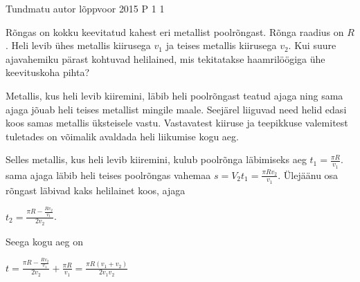 {Tundmatu autor} %
{lõppvoor} %
{2015} %
{P 1} %
{1} %
{

\ifStatement
Rõngas on kokku keevitatud kahest eri metallist poolrõngast. Rõnga raadius on $R$. Heli levib ühes metallis kiirusega $v_1$ ja teises metallis kiirusega $v_2$. Kui suure ajavahemiku pärast kohtuvad helilained, mis tekitatakse haamrilöögiga ühe keevituskoha pihta?
\fi

\ifHint
Metallis, kus heli levib kiiremini, läbib heli poolrõngast teatud ajaga ning sama ajaga jõuab heli teises metallist mingile maale. Seejärel liiguvad need helid edasi koos samas metallis üksteisele vastu. Vastavatest kiiruse ja teepikkuse valemitest tuletades on võimalik avaldada heli liikumise kogu aeg.
\fi

\ifSolution
Selles metallis, kus heli levib kiiremini, kulub poolrõnga läbimiseks aeg $t_1 = \frac{\pi R}{v_1}$. sama ajaga läbib heli teises poolrõngas vahemaa $s = V_2 t_1 = \frac{\pi R v_2}{v_1}$.
Ülejäänu osa rõngast läbivad kaks helilainet koos, ajaga 
\begin{center}
$t_2 = \frac{\pi R - \frac{R v_2}{v_1}}{2v_2}$.
\end{center}
Seega kogu aeg on 
\begin{center}
$t= \frac{\pi R - \frac{R v_2}{v_1}}{2v_2} + \frac{\pi R}{v_1} = \frac{\pi R (v_1 + v_2)}{2v_1 v_2}$
\end{center}
\fi
}